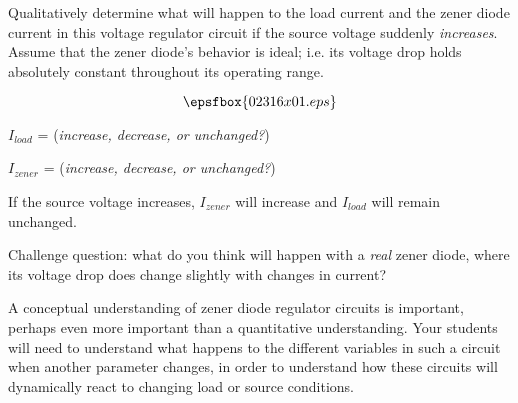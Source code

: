 

Qualitatively determine what will happen to the load current and the zener diode current in this voltage regulator circuit if the source voltage suddenly {\it increases}.  Assume that the zener diode's behavior is ideal; i.e. its voltage drop holds absolutely constant throughout its operating range.

$$\epsfbox{02316x01.eps}$$

$I_{load}$ = ({\it increase, decrease, or unchanged?})

\vskip 5pt

$I_{zener}$ = ({\it increase, decrease, or unchanged?})

\vskip 5pt







If the source voltage increases, $I_{zener}$ will increase and $I_{load}$ will remain unchanged.

\vskip 10pt

Challenge question: what do you think will happen with a {\it real} zener diode, where its voltage drop does change slightly with changes in current?







A conceptual understanding of zener diode regulator circuits is important, perhaps even more important than a quantitative understanding.  Your students will need to understand what happens to the different variables in such a circuit when another parameter changes, in order to understand how these circuits will dynamically react to changing load or source conditions.




